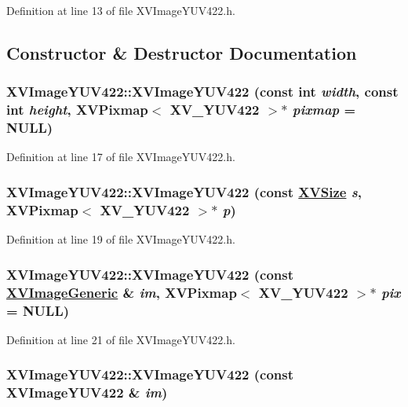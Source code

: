 Definition at line 13 of file XVImage\-YUV422.h.

\subsection{Constructor \& Destructor Documentation}
\label{XVImageYUV422_a0}
\hypertarget{class_XVImageYUV422_a0}{
\subsubsection[XVImageYUV422]{\setlength{\rightskip}{0pt plus 5cm}XVImage\-YUV422::XVImage\-YUV422 (const int {\em width}, const int {\em height}, XVPixmap$<$ XV\_\-YUV422 $>$$\ast$ {\em pixmap} = NULL)}}




Definition at line 17 of file XVImage\-YUV422.h.\label{XVImageYUV422_a1}
\hypertarget{class_XVImageYUV422_a1}{
\subsubsection[XVImageYUV422]{\setlength{\rightskip}{0pt plus 5cm}XVImage\-YUV422::XVImage\-YUV422 (const \hyperlink{class_XVSize}{XVSize} {\em s}, XVPixmap$<$ XV\_\-YUV422 $>$$\ast$ {\em p})}}




Definition at line 19 of file XVImage\-YUV422.h.\label{XVImageYUV422_a2}
\hypertarget{class_XVImageYUV422_a2}{
\subsubsection[XVImageYUV422]{\setlength{\rightskip}{0pt plus 5cm}XVImage\-YUV422::XVImage\-YUV422 (const \hyperlink{class_XVImageGeneric}{XVImage\-Generic} \& {\em im}, XVPixmap$<$ XV\_\-YUV422 $>$$\ast$ {\em pix} = NULL)}}




Definition at line 21 of file XVImage\-YUV422.h.\label{XVImageYUV422_a3}
\hypertarget{class_XVImageYUV422_a3}{
\subsubsection[XVImageYUV422]{\setlength{\rightskip}{0pt plus 5cm}XVImage\-YUV422::XVImage\-YUV422 (const XVImage\-YUV422 \& {\em im})}}




